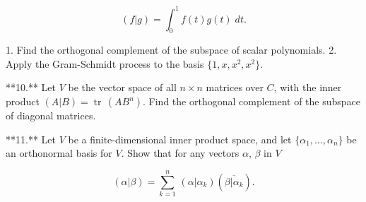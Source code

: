 \[(f|g)=\int_{0}^{1}f(t)g(t)\;dt.\]

1. Find the orthogonal complement of the subspace of scalar polynomials.
2. Apply the Gram-Schmidt process to the basis \(\{1,x,x^{2},x^{2}\}\).

**10.** Let \(V\) be the vector space of all \(n\times n\) matrices over \(C\), with the inner product \((A|B)=\operatorname{tr}\,(AB^{n})\). Find the orthogonal complement of the subspace of diagonal matrices.

**11.** Let \(V\) be a finite-dimensional inner product space, and let \(\{\alpha_{1},\ldots,\alpha_{n}\}\) be an orthonormal basis for \(V\). Show that for any vectors \(\alpha\), \(\beta\) in \(V\)

\[(\alpha|\beta)=\sum_{k=1}^{n}\,(\alpha|\alpha_{k})(\overline{\beta|\alpha_{k}}).\] 
